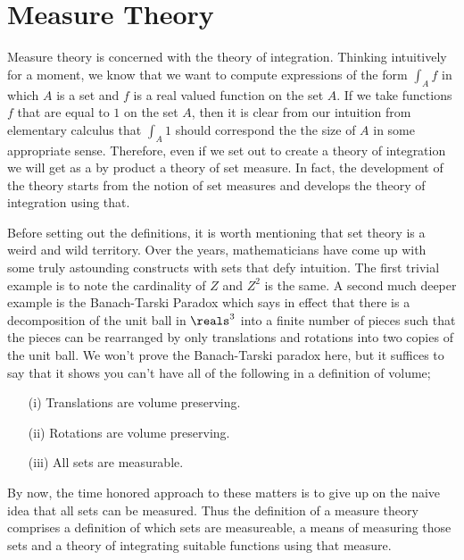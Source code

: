 \chapter{Measure Theory}
Measure theory is concerned with the theory of integration.  Thinking
intuitively for a moment, we know that we want to compute
expressions of the form $\int_A f$ in which $A$ is a set and $f$ is a
real valued function on the set $A$.  If we take functions $f$ that
are equal to $1$ on the set $A$, then it is clear from our intuition
from elementary calculus that $\int_A 1$ should correspond the the
size of $A$ in some appropriate sense.  Therefore, even if we set out
to create a theory of integration we will get as a by product a theory
of set measure.  In fact, the development of the theory starts from
the notion of set measures and develops the theory of integration
using that.

Before setting out the definitions, it is worth mentioning that set
theory is a weird and wild territory.  Over the years, mathematicians
have come up with some truly astounding constructs with sets that defy
intuition. The first trivial example is to note the cardinality of $Z$
and $Z^2$ is the same.  A second much deeper example is the
Banach-Tarski Paradox which says in effect that there is a
decomposition of the unit ball in $\reals^3$ into a finite number of
pieces such that the pieces can be rearranged by only translations and
rotations into two copies of the unit ball.  We won't prove the
Banach-Tarski paradox here, but it suffices to say that it shows you
can't have all of the following in a definition of volume;
\begin{itemize}
\item[(i)]Translations are volume preserving.
\item[(ii)]Rotations are volume preserving.
\item[(iii)]All sets are measurable.
\end{itemize}

By now, the time honored approach to these matters is to give up on
the naive idea that all sets can be measured.  Thus the definition of a measure theory comprises a definition of
which sets are measureable, a means of measuring those sets and a
theory of integrating suitable functions using that measure.



